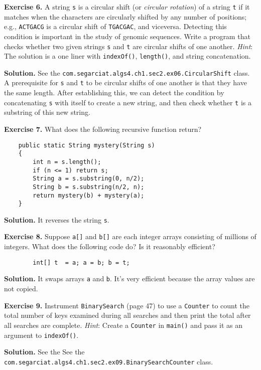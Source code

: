 \documentclass[12pt, a4paper]{article}
\newenvironment{ex}[2][Exercise]
{\par\medskip\noindent \textbf{#1 #2.}}
{\medskip}
\newenvironment{sol}[1][Solution]
{\par\medskip\noindent \textbf{#1.} }
{\medskip}
\begin{document}
	\begin{ex}{6}
		A string \texttt{s} is a circular shift (or \emph{circular rotation}) of a string
		\texttt{t} if it matches when the characters are circularly shifted by any number
		of positions; e.g., \texttt{ACTGACG} is a circular shift of \texttt{TGACGAC}, and
		viceversa. Detecting this condition is important in the study of genomic sequences.
		Write a program that checks whether two given strings \texttt{s} and \texttt{t}
		are circular shifts of one another. \emph{Hint}: The solution is a one liner with
		\texttt{indexOf()}, \texttt{length()}, and string concatenation.
	\end{ex}
	\begin{sol}
		See the \texttt{com.segarciat.algs4.ch1.sec2.ex06.CircularShift} class.
		A prerequisite for \texttt{s} and \texttt{t} to be circular shifts of one another
		is that they have the same length. After establishing this, we can detect the
		condition by concatenating \texttt{s} with itself to create a new string,
		and then check whether \texttt{t} is a substring of this new string.
	\end{sol}
	\begin{ex}{7}
		What does the following recursive function return?
		\begin{lstlisting}
	public static String mystery(String s)
	{
		int n = s.length();
		if (n <= 1) return s;
		String a = s.substring(0, n/2);
		String b = s.substring(n/2, n);
		return mystery(b) + mystery(a);
	}
		\end{lstlisting}
	\end{ex}
	\begin{sol}
		It reverses the string \texttt{s}.
	\end{sol}
	\begin{ex}{8}
		Suppose \texttt{a[]} and \texttt{b[]} are each integer arrays consisting of millions
		of integers. What does the following code do? Is it reasonably efficient?
		\begin{lstlisting}
		int[] t  = a; a = b; b = t;
		\end{lstlisting}
	\end{ex}
	\begin{sol}
		It swaps arrays \texttt{a} and \texttt{b}. It's very efficient because the array
		values are not copied.
	\end{sol}
	\begin{ex}{9}
		Instrument \texttt{BinarySearch} (page 47) to use a \texttt{Counter} to count the total
		number of keys examined during all searches and then print the total after all searches
		are complete. \emph{Hint}: Create a \texttt{Counter} in \texttt{main()} and pass it as
		an argument to \texttt{indexOf()}.
	\end{ex}
	\begin{sol}
		See the See the \texttt{com.segarciat.algs4.ch1.sec2.ex09.BinarySearchCounter} class.
	\end{sol}
	\pagebreak
	\printbibliography
\end{document}
